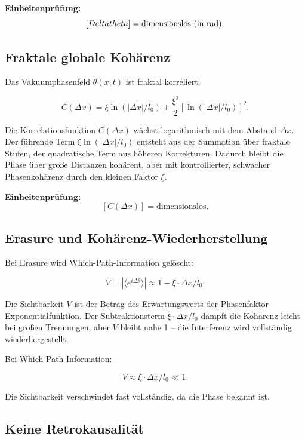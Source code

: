 	\textbf{Einheitenprüfung:}
	\[
	[Delta theta] = \text{dimensionslos (in \si{\radian})}.
	\]
	
	\subsection*{Fraktale globale Kohärenz}
	
	Das Vakuumphasenfeld \(\theta(x,t)\) ist fraktal korreliert:
	
	\begin{equation}
		C(\Delta x) = \xi \ln(|\Delta x|/l_0) + \frac{\xi^2}{2} [\ln(|\Delta x|/l_0)]^2.
	\end{equation}
	
	Die Korrelationsfunktion \(C(\Delta x)\) wächst logarithmisch mit dem Abstand \(\Delta x\). Der führende Term \(\xi \ln(|\Delta x|/l_0)\) entsteht aus der Summation über fraktale Stufen, der quadratische Term aus höheren Korrekturen. Dadurch bleibt die Phase über große Distanzen kohärent, aber mit kontrollierter, schwacher Phasenkohärenz durch den kleinen Faktor \(\xi\).
	
	\textbf{Einheitenprüfung:}
	\[
	[C(\Delta x)] = \text{dimensionslos}.
	\]
	
	\subsection*{Erasure und Kohärenz-Wiederherstellung}
	
	Bei Erasure wird Which-Path-Information gelöscht:
	
	\begin{equation}
		V = |\langle e^{i \Delta \theta} \rangle| \approx 1 - \xi \cdot \Delta x / l_0.
	\end{equation}
	
	Die Sichtbarkeit \(V\) ist der Betrag des Erwartungswerts der Phasenfaktor-Exponentialfunktion. Der Subtraktionsterm \(\xi \cdot \Delta x / l_0\) dämpft die Kohärenz leicht bei großen Trennungen, aber \(V\) bleibt nahe 1 – die Interferenz wird vollständig wiederhergestellt.
	
	Bei Which-Path-Information:
	
	\begin{equation}
		V \approx \xi \cdot \Delta x / l_0 \ll 1.
	\end{equation}
	
	Die Sichtbarkeit verschwindet fast vollständig, da die Phase bekannt ist.
	
	\subsection*{Keine Retrokausalität}
	
